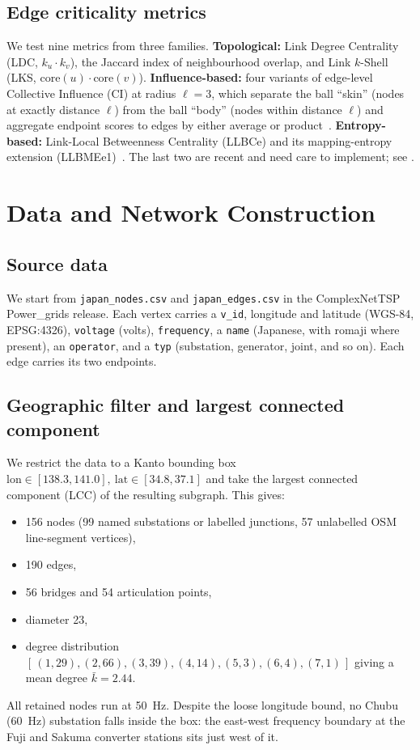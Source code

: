 \documentclass[11pt,a4paper]{article}
\begin{document}
\subsection{Edge criticality metrics}
We test nine metrics from three families. \textbf{Topological:}
Link Degree Centrality (LDC, $k_u \cdot k_v$), the Jaccard index of
neighbourhood overlap, and Link $k$-Shell (LKS, $\text{core}(u) \cdot
\text{core}(v)$). \textbf{Influence-based:} four variants of edge-level
Collective Influence (CI) at radius $\ell{=}3$, which separate the ball
``skin'' (nodes at exactly distance $\ell$) from the ball ``body''
(nodes within distance $\ell$) and aggregate endpoint scores to edges by
either average or product~\cite{morone2015influence,kitsak2024edge}.
\textbf{Entropy-based:} Link-Local Betweenness Centrality (LLBCe) and
its mapping-entropy extension (LLBMEe1)~\cite{li2024llbce}. The last two
are recent and need care to implement; see .

\section{Data and Network Construction}
\label{sec:data}

\subsection{Source data}
We start from \texttt{japan\_nodes.csv} and \texttt{japan\_edges.csv} in
the ComplexNetTSP Power\_grids release. Each vertex carries a
\texttt{v\_id}, longitude and latitude (WGS-84, EPSG:4326),
\texttt{voltage} (volts), \texttt{frequency}, a \texttt{name} (Japanese,
with romaji where present), an \texttt{operator}, and a \texttt{typ}
(substation, generator, joint, and so on). Each edge carries its two
endpoints.

\subsection{Geographic filter and largest connected component}
We restrict the data to a Kanto bounding box
\(\text{lon} \in [138.3, 141.0],\ \text{lat} \in [34.8, 37.1]\)
and take the largest connected component (LCC) of the resulting
subgraph. This gives:
\begin{itemize}
\item \num{156} nodes (\num{99} named substations or labelled junctions,
\num{57} unlabelled OSM line-segment vertices),
\item \num{190} edges,
\item \num{56} bridges and \num{54} articulation points,
\item diameter \num{23},
\item degree distribution
$[\,(1,29),(2,66),(3,39),(4,14),(5,3),(6,4),(7,1)\,]$
giving a mean degree $\bar k = \num{2.44}$.
\end{itemize}
All retained nodes run at \SI{50}{\hertz}. Despite the loose longitude
bound, no Chubu (\SI{60}{\hertz}) substation falls inside the box: the
east-west frequency boundary at the Fuji and Sakuma converter stations
sits just west of it.
\end{document}
